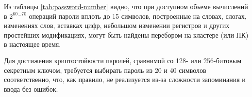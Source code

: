 \documentclass[10pt,a4paper]{book}
\begin{document}
\begin{table}[!ht]
    \centering
    \caption{Различные верхние оценки числа паролей\label{tab:password-number}}
\end{table}

Из таблицы \ref{tab:password-number} видно, что при доступном объеме вычислений в $2^{60 \ldots 70}$ операций пароли вплоть до 15 символов, построенные на словах, слогах, изменениях слов, вставках цифр, небольшом изменении регистров и других простейших модификациях, могут быть найдены перебором на кластере (или ПК) в настоящее время.

Для достижения криптостойкости паролей, сравнимой со 128- или 256-битовым секретным ключом, требуется выбирать пароль из 20 и 40 символов соответственно, что, как правило, не реализуется из-за сложности запоминания и ввода без ошибок.
\end{document}
